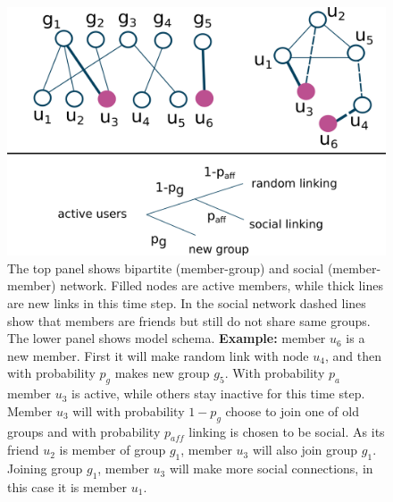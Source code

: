 \begin{figure}[h!]
	\centering
	\includegraphics[scale=0.5]{Figures/figures/test.png}
	\caption{The top panel shows bipartite (member-group) and social (member-member) network. Filled nodes are active members, while thick lines are new links in this time step. In the social network dashed lines show that members are friends but still do not share same groups. The lower panel shows model schema. \textbf{Example:} member $u_6$ is a new member. First it will make random link  with node $u_4$, and then with probability $p_g$ makes new group $g_5$. With probability $p_a$ member $u_3$ is active, while others stay inactive for this time step. Member $u_3$ will with probability $1-p_g$ choose to join one of old groups and with probability $p_{aff}$ linking is chosen to be social. As its friend $u_2$ is member of group $g_1$, member $u_3$ will also join group $g_1$. Joining group $g_1$, member $u_3$ will make more social connections, in this case it is member $u_1$.}
	\label{fig:schema}
\end{figure}

